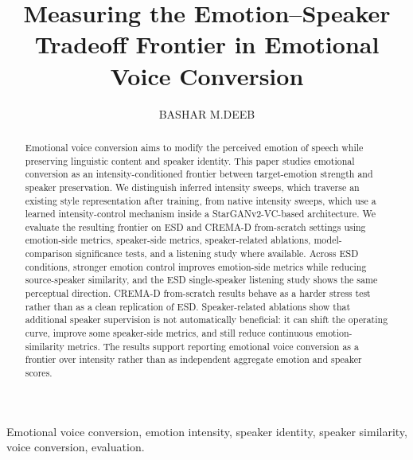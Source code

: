 \documentclass{ieeeaccess}
\begin{document}

\title{Measuring the Emotion--Speaker Tradeoff Frontier in Emotional Voice Conversion}

\author{\uppercase{Bashar M.Deeb}}
\address[1]{Department, University, City, Country (e-mail: author@example.com)}

\begin{abstract}
Emotional voice conversion aims to modify the perceived emotion of speech while preserving linguistic content and speaker identity.
This paper studies emotional conversion as an intensity-conditioned frontier between target-emotion strength and speaker preservation.
We distinguish inferred intensity sweeps, which traverse an existing style representation after training, from native intensity sweeps, which use a learned intensity-control mechanism inside a StarGANv2-VC-based architecture.
We evaluate the resulting frontier on ESD and CREMA-D from-scratch settings using emotion-side metrics, speaker-side metrics, speaker-related ablations, model-comparison significance tests, and a listening study where available.
Across ESD conditions, stronger emotion control improves emotion-side metrics while reducing source-speaker similarity, and the ESD single-speaker listening study shows the same perceptual direction.
CREMA-D from-scratch results behave as a harder stress test rather than as a clean replication of ESD.
Speaker-related ablations show that additional speaker supervision is not automatically beneficial: it can shift the operating curve, improve some speaker-side metrics, and still reduce continuous emotion-similarity metrics.
The results support reporting emotional voice conversion as a frontier over intensity rather than as independent aggregate emotion and speaker scores.
\end{abstract}

\begin{keywords}
Emotional voice conversion, emotion intensity, speaker identity, speaker similarity, voice conversion, evaluation.
\end{keywords}

\titlepgskip=-15pt

\maketitle
\end{document}
